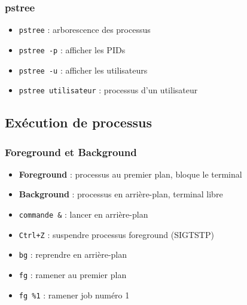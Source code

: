 \documentclass[12pt,a4paper]{article}
\begin{document}
\subsubsection{pstree}
\begin{itemize}
    \item \texttt{pstree} : arborescence des processus %
    \item \texttt{pstree -p} : afficher les PIDs %
    \item \texttt{pstree -u} : afficher les utilisateurs %
    \item \texttt{pstree utilisateur} : processus d'un utilisateur %
\end{itemize}


\subsection{Ex\'ecution de processus}

\subsubsection{Foreground et Background}
\begin{itemize}
    \item \textbf{Foreground} : processus au premier plan, bloque le terminal %
    \item \textbf{Background} : processus en arri\`ere-plan, terminal libre %
    \item \texttt{commande \&} : lancer en arri\`ere-plan %
    \item \texttt{Ctrl+Z} : suspendre processus foreground (SIGTSTP) %
    \item \texttt{bg} : reprendre en arri\`ere-plan %
    \item \texttt{fg} : ramener au premier plan %
    \item \texttt{fg \%1} : ramener job num\'ero 1 %
\end{itemize}
\end{document}
